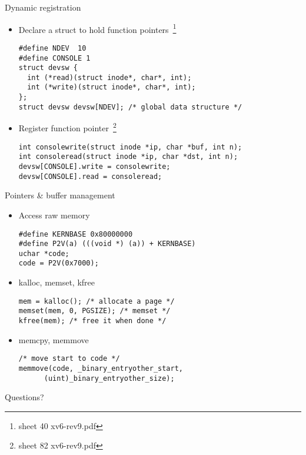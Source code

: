 \documentclass[10pt]{beamer}
\begin{document}
\begin{frame}[fragile]{Dynamic registration}
\small
\begin{itemize}
\item<1-> Declare a struct to hold function pointers~\footnote{sheet 40 xv6-rev9.pdf}
\begin{verbatim}
#define NDEV  10
#define CONSOLE 1
struct devsw {
  int (*read)(struct inode*, char*, int);
  int (*write)(struct inode*, char*, int);
};
struct devsw devsw[NDEV]; /* global data structure */
\end{verbatim}
\item<2-> Register function pointer~\footnote{sheet 82 xv6-rev9.pdf}
\begin{verbatim}
int consolewrite(struct inode *ip, char *buf, int n);
int consoleread(struct inode *ip, char *dst, int n);
devsw[CONSOLE].write = consolewrite;
devsw[CONSOLE].read = consoleread;
\end{verbatim}
\end{itemize}
\end{frame}

\begin{frame}[fragile]{Pointers \& buffer management}
\begin{itemize}
\item<1-> Access raw memory
\begin{verbatim}
#define KERNBASE 0x80000000
#define P2V(a) (((void *) (a)) + KERNBASE)
uchar *code;
code = P2V(0x7000);
\end{verbatim}
\item<2-> kalloc, memset, kfree
\begin{verbatim}
mem = kalloc(); /* allocate a page */
memset(mem, 0, PGSIZE); /* memset */
kfree(mem); /* free it when done */
\end{verbatim}
\item<3-> memcpy, memmove
\begin{verbatim}
/* move start to code */
memmove(code, _binary_entryother_start,
      (uint)_binary_entryother_size);
\end{verbatim}
\end{itemize}
\end{frame}


\begin{frame}[standout]
  Questions?
\end{frame}
\end{document}
